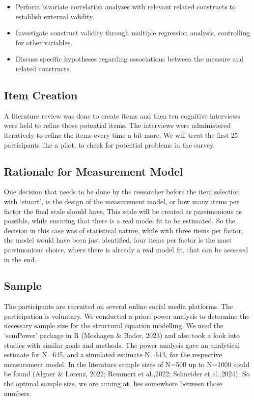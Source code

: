 \documentclass[
  12pt,
  a4paper,
  twoside]{article}
\providecommand{\tightlist}{%
  \setlength{\itemsep}{0pt}\setlength{\parskip}{0pt}}
\begin{document}
\begin{itemize}
\tightlist
\item
  Perform bivariate correlation analyses with relevant related constructs to establish external validity.
\item
  Investigate construct validity through multiple regression analysis, controlling for other variables.
\item
  Discuss specific hypotheses regarding associations between the measure and related constructs.
\end{itemize}

\subsection{Item Creation}\label{item-creation}

A literature review was done to create items and then ten cognitive interviews were held to refine those potential items. The interviews were administered iteratively to refine the items every time a bit more. We will treat the first 25 participants like a pilot, to check for potential problems in the survey.

\subsection{Rationale for Measurement Model}\label{rationale-for-measurement-model}

One decision that needs to be done by the researcher before the item selection with `stuart', is the design of the measurement model, or how many items per factor the final scale should have.
This scale will be created as parsimonious as possible, while ensuring that there is a real model fit to be estimated. So the decision in this case was of statistical nature, while with three items per factor, the model would have been just identified, four items per factor is the most parsimonious choice, where there is already a real model fit, that can be assessed in the end.

\subsection{Sample}\label{sample}

The participants are recruited on several online social media platforms. The participation is voluntary. We conducted a-priori power analysis to determine the necessary sample size for the structural equation modelling. We used the `semPower' package in R (Moshagen \& Bader, 2023) and also took a look into studies with similar goals and methods. The power analysis gave an analytical estimate for N=645, and a simulated estimate N=613, for the respective measurement model. In the literature sample sizes of N=500 up to N=1000 could be found (Algner \& Lorenz, 2022; Remmert et al.,2022; Schneider et al.,2024). So the optimal sample size, we are aiming at, lies somewhere between those numbers.
\end{document}
